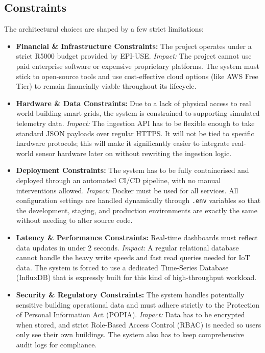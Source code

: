 \documentclass[12pt, a4paper]{article}
\begin{document}
\subsection{Constraints}
The architectural choices are shaped by a few strict limitations:
\begin{itemize}
    \item \textbf{Financial \& Infrastructure Constraints:} The project operates under a strict R5000 budget provided by EPI-USE. \textit{Impact:} The project cannot use paid enterprise software or expensive proprietary platforms. The system must stick to open-source tools and use cost-effective cloud options (like AWS Free Tier) to remain financially viable throughout its lifecycle.
    \item \textbf{Hardware \& Data Constraints:} Due to a lack of physical access to real world building smart grids, the system is constrained to supporting simulated telemetry data. \textit{Impact:} The ingestion API has to be flexible enough to take standard JSON payloads over regular HTTPS. It will not be tied to specific hardware protocols; this will make it significantly easier to integrate real-world sensor hardware later on without rewriting the ingestion logic.
    \item \textbf{Deployment Constraints:} The system has to be fully containerised and deployed through an automated CI/CD pipeline, with no manual interventions allowed. \textit{Impact:} Docker must be used for all services. All configuration settings are handled dynamically through \texttt{.env} variables so that the development, staging, and production environments are exactly the same without needing to alter source code.
    \item \textbf{Latency \& Performance Constraints:} Real-time dashboards must reflect data updates in under 2 seconds. \textit{Impact:} A regular relational database cannot handle the heavy write speeds and fast read queries needed for IoT data. The system is forced to use a dedicated Time-Series Database (InfluxDB) that is expressly built for this kind of high-throughput workload.
    \item \textbf{Security \& Regulatory Constraints:} The system handles potentially sensitive building operational data and must adhere strictly to the Protection of Personal Information Act (POPIA). \textit{Impact:} Data has to be encrypted when stored, and strict Role-Based Access Control (RBAC) is needed so users only see their own buildings. The system also has to keep comprehensive audit logs for compliance.
\end{itemize}
 \newpage
\end{document}
